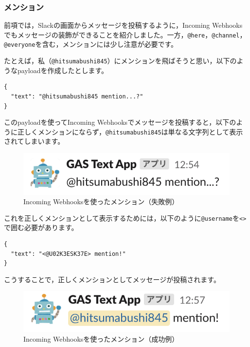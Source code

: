 \documentclass[uplatex,a4j]{jsarticle}
\begin{document}
\subsubsection{メンション}

前項では，Slackの画面からメッセージを投稿するように，Incoming Webhooksでもメッセージの装飾ができることを紹介しました。一方，\verb|@here|，\verb|@channel|，\verb|@everyone|を含む，メンションには少し注意が必要です。


たとえば，私（\verb|@hitsumabushi845|）にメンションを飛ばそうと思い，以下のようなpayloadを作成したとします。

\begin{lstlisting}[basicstyle=\ttfamily\footnotesize,frame=single,caption=mention payload sample1,label=mrkdwnmentionpayloadfailed]
{
  "text": "@hitsumabushi845 mention...?"
}
\end{lstlisting}

このpayloadを使ってIncoming Webhooksでメッセージを投稿すると，以下のように正しくメンションにならず，\verb|@hitsumabushi845|は単なる文字列として表示されてしまいます。

\begin{figure}[H]
 \centering
 \includegraphics[keepaspectratio, scale=0.8]{images/mention1.png}
 \caption{Incoming Webhooksを使ったメンション（失敗例）}
 \label{fig:mention1}
\end{figure}

これを正しくメンションとして表示するためには，以下のように\verb|@username|を\verb|<>|で囲む必要があります。

\begin{lstlisting}[basicstyle=\ttfamily\footnotesize,frame=single,caption=mention payload sample2,label=mrkdwnmentionpayloadsuccess]
{
  "text": "<@U02K3ESK37E> mention!"
}
\end{lstlisting}

こうすることで，正しくメンションとしてメッセージが投稿されます。

\begin{figure}[H]
 \centering
 \includegraphics[keepaspectratio, scale=0.8]{images/mention2.png}
 \caption{Incoming Webhooksを使ったメンション（成功例）}
 \label{fig:mention2}
\end{figure}
\end{document}

